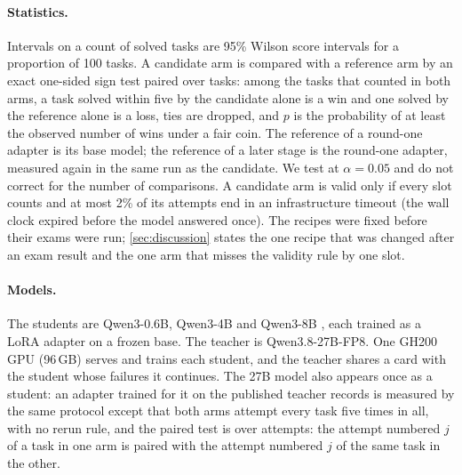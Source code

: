 \paragraph{Statistics.} Intervals on a count of solved tasks are 95\% Wilson score intervals \citep{wilson} for a
proportion of 100 tasks. A candidate arm is compared with a reference arm by an exact one-sided sign test paired over
tasks: among the tasks that counted in both arms, a task solved within five by the candidate alone is
a win and one solved by the reference alone is a loss, ties are dropped, and $p$ is the probability of at least the
observed number of wins under a fair coin. The reference of a round-one adapter is its base model; the reference of a
later stage is the round-one adapter, measured again in the same run as the candidate. We test at $\alpha=0.05$ and do
not correct for the number of comparisons. A candidate arm is valid only if every slot counts and at most 2\% of its
attempts end in an infrastructure timeout (the wall clock expired before the model answered once). The recipes were
fixed before their exams were run; \cref{sec:discussion} states the one recipe that was changed after an exam result
and the one arm that misses the validity rule by one slot.

\paragraph{Models.} The students are Qwen3-0.6B, Qwen3-4B and Qwen3-8B \citep{qwen3}, each trained as a LoRA adapter
\citep{lora} on a frozen base. The teacher is Qwen3.8-27B-FP8. One GH200 GPU (96\,GB) serves and trains each student,
and the teacher shares a card with the student whose failures it continues. The 27B model also appears once as a
student: an adapter trained for it on the published teacher records is measured by the same protocol except that both arms
attempt every task five times in all, with no rerun rule, and the paired test is over attempts: the attempt numbered $j$ of a task
in one arm is paired with the attempt numbered $j$ of the same task in the other.
